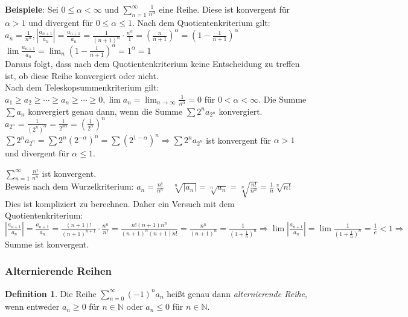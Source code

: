 \documentclass[ngerman,titlepage,twoside, parskip=half*]{scrreprt}
\newcommand*{\N}{\mathbb{N}}
\theoremstyle{plain}
\theoremstyle{definition}
\newtheorem{definition}{Definition}
\theoremstyle{remark}
\begin{document}
\textbf{Beispiele}: Sei $0\leq \alpha <\infty$ und $\sum_{n=1}^\infty \frac{1}{n^\alpha}$ eine Reihe. Diese ist
konvergent für $\alpha>1$ und divergent für $0\leq \alpha \leq 1$. Nach dem Quotientenkriterium gilt:\\
$a_n=\frac{1}{n^\alpha}, |\frac{a_{n+1}}{a_n}|=\frac{a_{n+1}}{a_n}=\frac{1}{(n+1)^\alpha}\cdot \frac{n^\alpha}{1}=
(\frac{n}{n+1})^\alpha=(1-\frac{1}{n+1})^\alpha$\\
$\lim \frac{a_{n+1}}{a_n}=\lim_n (1-\frac{1}{n+1})^\alpha=1^\alpha=1$\\
Daraus folgt, dass nach dem Quotientenkriterium keine Entscheidung zu treffen ist, ob diese Reihe konvergiert oder nicht.\\
Nach dem Teleskopsummenkriterium gilt:\\
$a_1\geq a_2\geq \cdots \geq a_n\geq \cdots \geq 0, \lim a_n=\lim_{n\rightarrow \infty}\frac{1}{n^\alpha}=0$ für $0<
\alpha<\infty$. Die Summe $\sum a_n$ konvergiert genau dann, wenn die Summe $\sum 2^na_{2^n}$ konvergiert.\\
$a_{2^n}=\frac{1}{(2^n)^\alpha}=\frac{1}{2^{n\alpha}}=(\frac{1}{2^\alpha})^n$\\
$\sum 2^na_{2^n}=\sum2^n(2^{-\alpha})^n=\sum (2^{1-\alpha})^n\Rightarrow \sum 2^na_{2^n}$ ist konvergent für $\alpha>1$
und divergent für $\alpha \leq 1$.

$\sum_{n=1}^\infty \frac{n!}{n^n}$ ist konvergent.\\
Beweis nach dem Wurzelkriterium: $a_n=\frac{n!}{n^n} \quad \sqrt[n]{|a_n|}=\sqrt[n]{a_n}=\sqrt[n]{\frac{n!}{n^n}}=
\frac{1}{n}\sqrt[n]{n!}$ Dies ist kompliziert zu berechnen. Daher ein Versuch mit dem Quotientenkriterium:\\
$|\frac{a_{n+1}}{a_n}|=\frac{a_{n+1}}{a_n}=\frac{(n+1)!}{(n+1)^{n+1}}\cdot \frac{n^n}{n!}=\frac{n!(n+1)n^n}{(n+1)^n(n+1)n!}
=\frac{n^n}{(n+1)^n}=\frac{1}{(1+\frac{1}{n})^n}\Rightarrow \lim |\frac{a_{n+1}}{a_n}|=\lim \frac{1}{(1+\frac{1}{n})^n}=
\frac{1}{e}<1\Rightarrow$  Summe ist konvergent.

\subsubsection{Alternierende Reihen}
\begin{definition}
Die Reihe $\sum_{n=0}^\infty (-1)^na_n$ heißt genau dann \emph{alternierende Reihe}, wenn
entweder $a_n\geq 0$ für $n \in \N$ oder $a_n\leq 0$ für $n \in \N$.
\end{definition}
\end{document}
